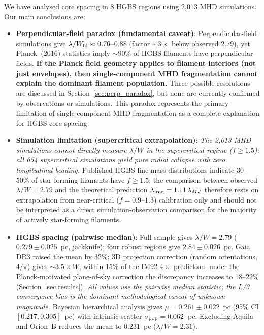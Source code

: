 \documentclass[twoside,twocolumn]{mnras}
\begin{document}
\noindent We have analysed core spacing in 8 HGBS regions using 2,013 MHD simulations. Our main conclusions are:

\begin{itemize}

    \item \textbf{Perpendicular-field paradox (fundamental caveat)}: Perpendicular-field simulations give $\lambda/W_{\rm fil} \approx 0.76$--$0.88$ (factor ${\sim}3\times$ below observed $2.79$), yet Planck~(2016) statistics imply ${\sim}90\%$ of HGBS filaments have perpendicular fields. \textbf{If the Planck field geometry applies to filament interiors (not just envelopes), then single-component MHD fragmentation cannot explain the dominant filament population.} Three possible resolutions are discussed in Section~\ref{sec:perp_paradox}, but none are currently confirmed by observations or simulations. This paradox represents the primary limitation of single-component MHD fragmentation as a complete explanation for HGBS core spacing.

    \item \textbf{Simulation limitation (supercritical extrapolation)}: \textit{The 2,013 MHD simulations cannot directly measure $\lambda/W$ in the supercritical regime ($f \geq 1.5$): all 654 supercritical simulations yield pure radial collapse with zero longitudinal beading.} Published HGBS line-mass distributions indicate 30--50\% of star-forming filaments have $f \geq 1.5$; the comparison between observed $\lambda/W = 2.79$ and the theoretical prediction $\lambda_{\rm frag} = 1.11\,\lambda_{MJ}$ therefore rests on extrapolation from near-critical ($f = 0.9$--$1.3$) calibration only and should not be interpreted as a direct simulation-observation comparison for the majority of actively star-forming filaments.

    \item \textbf{HGBS spacing (pairwise median)}: Full sample gives $\lambda/W = 2.79$
    ($0.279 \pm 0.025$~pc, jackknife); four robust regions give $2.84 \pm 0.026$~pc.
    Gaia DR3 raised the mean by 32\%; 3D projection correction (random orientations,
    $4/\pi$) gives ${\sim}3.5\times W$, within 15\% of the IM92 $4\times$ prediction;
    under the Planck-motivated plane-of-sky correction the discrepancy increases to
    18--22\% (Section~\ref{sec:results}).
    \textit{All values use the pairwise median statistic; the L/3 convergence bias is
    the dominant methodological caveat of unknown magnitude.} Bayesian hierarchical
    analysis gives $\mu = 0.261 \pm 0.022$~pc (95\% CI $[0.217, 0.305]$~pc) with
    intrinsic scatter $\sigma_{\rm pop} = 0.062$~pc. Excluding Aquila and Orion~B
    reduces the mean to $0.231$~pc ($\lambda/W = 2.31$).


\end{itemize}
\end{document}

